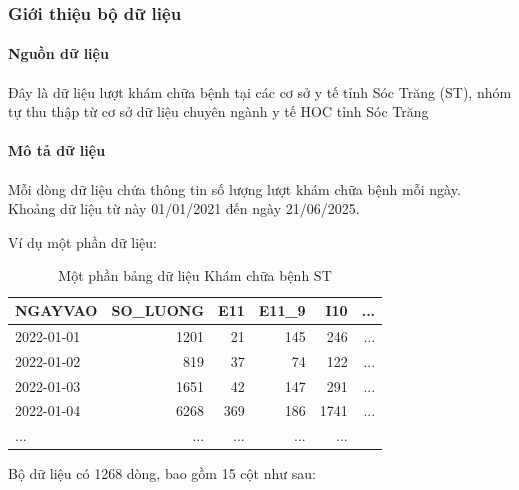 \subsubsection{Giới thiệu bộ dữ liệu}
    \paragraph{Nguồn dữ liệu}
    \leavevmode

    Đây là dữ liệu lượt khám chữa bệnh tại các cơ sở y tế tỉnh Sóc Trăng (ST), nhóm tự thu thập từ cơ sở dữ liệu chuyên ngành y tế HOC tỉnh Sóc Trăng

    \paragraph{Mô tả dữ liệu}
    \leavevmode

    Mỗi dòng dữ liệu chứa thông tin số lượng lượt khám chữa bệnh mỗi ngày. Khoảng dữ liệu từ này 01/01/2021 đến ngày 21/06/2025.

    Ví dụ một phần dữ liệu:

    \begin{table}[htbp]
    \centering
    \caption{Một phần bảng dữ liệu Khám chữa bệnh ST}
    \label{tab:stat-yte-exp}
        \begin{tabular}{|l|r|r|r|r|r|}
        \hline
        NGAYVAO & SO\_LUONG & E11 & E11\_9 & I10 & ... \\
        \hline
        2022-01-01 & 1201 & 21 & 145 & 246 & ... \\
        \hline
        2022-01-02 & 819 & 37 & 74 & 122 & ... \\
        \hline
        2022-01-03 & 1651 & 42 & 147 & 291 & ... \\
        \hline
        2022-01-04 & 6268 & 369 & 186 & 1741 & ... \\
        \hline
        ... & ... & ... & ... & ... \\
        \hline
        \end{tabular}

    \end{table}

    Bộ dữ liệu có 1268 dòng, bao gồm 15 cột như sau:


